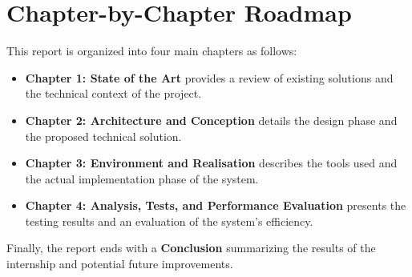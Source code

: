 \section*{Chapter-by-Chapter Roadmap}
This report is organized into four main chapters as follows:
\begin{itemize}
    \item \textbf{Chapter 1: State of the Art} provides a review of existing solutions and the technical context of the project.
    \item \textbf{Chapter 2: Architecture and Conception} details the design phase and the proposed technical solution.
    \item \textbf{Chapter 3: Environment and Realisation} describes the tools used and the actual implementation phase of the system.
    \item \textbf{Chapter 4: Analysis, Tests, and Performance Evaluation} presents the testing results and an evaluation of the system's efficiency.
\end{itemize}

Finally, the report ends with a \textbf{Conclusion} summarizing the results of the internship and potential future improvements.